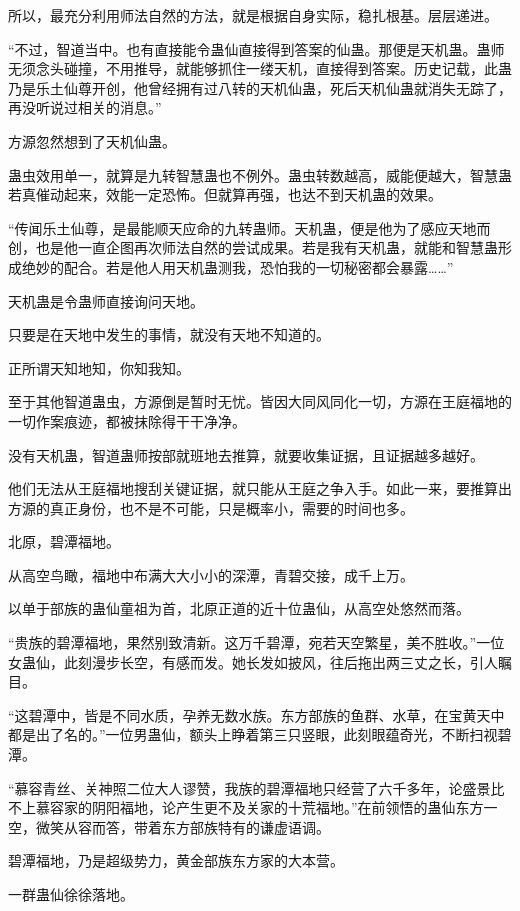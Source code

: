 \begin{this_body}
所以，最充分利用师法自然的方法，就是根据自身实际，稳扎根基。层层递进。

“不过，智道当中。也有直接能令蛊仙直接得到答案的仙蛊。那便是天机蛊。蛊师无须念头碰撞，不用推导，就能够抓住一缕天机，直接得到答案。历史记载，此蛊乃是乐土仙尊开创，他曾经拥有过八转的天机仙蛊，死后天机仙蛊就消失无踪了，再没听说过相关的消息。”

方源忽然想到了天机仙蛊。

蛊虫效用单一，就算是九转智慧蛊也不例外。蛊虫转数越高，威能便越大，智慧蛊若真催动起来，效能一定恐怖。但就算再强，也达不到天机蛊的效果。

“传闻乐土仙尊，是最能顺天应命的九转蛊师。天机蛊，便是他为了感应天地而创，也是他一直企图再次师法自然的尝试成果。若是我有天机蛊，就能和智慧蛊形成绝妙的配合。若是他人用天机蛊测我，恐怕我的一切秘密都会暴露……”

天机蛊是令蛊师直接询问天地。

只要是在天地中发生的事情，就没有天地不知道的。

正所谓天知地知，你知我知。

至于其他智道蛊虫，方源倒是暂时无忧。皆因大同风同化一切，方源在王庭福地的一切作案痕迹，都被抹除得干干净净。

没有天机蛊，智道蛊师按部就班地去推算，就要收集证据，且证据越多越好。

他们无法从王庭福地搜刮关键证据，就只能从王庭之争入手。如此一来，要推算出方源的真正身份，也不是不可能，只是概率小，需要的时间也多。

北原，碧潭福地。

从高空鸟瞰，福地中布满大大小小的深潭，青碧交接，成千上万。

以单于部族的蛊仙童祖为首，北原正道的近十位蛊仙，从高空处悠然而落。

“贵族的碧潭福地，果然别致清新。这万千碧潭，宛若天空繁星，美不胜收。”一位女蛊仙，此刻漫步长空，有感而发。她长发如披风，往后拖出两三丈之长，引人瞩目。

“这碧潭中，皆是不同水质，孕养无数水族。东方部族的鱼群、水草，在宝黄天中都是出了名的。”一位男蛊仙，额头上睁着第三只竖眼，此刻眼蕴奇光，不断扫视碧潭。

“慕容青丝、关神照二位大人谬赞，我族的碧潭福地只经营了六千多年，论盛景比不上慕容家的阴阳福地，论产生更不及关家的十荒福地。”在前领悟的蛊仙东方一空，微笑从容而答，带着东方部族特有的谦虚语调。

碧潭福地，乃是超级势力，黄金部族东方家的大本营。

一群蛊仙徐徐落地。


\end{this_body}
